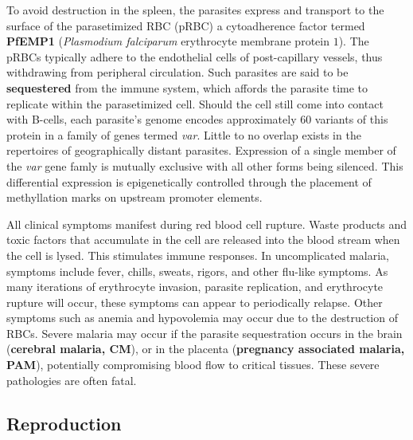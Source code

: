 To avoid destruction in the spleen, the parasites express and transport to the surface of the parasetimized RBC (pRBC) a cytoadherence factor termed \textbf{PfEMP1} (\textit{Plasmodium falciparum} erythrocyte membrane protein $1$)\cite{Flick:2004fn}.  The pRBCs typically adhere to the endothelial cells of post-capillary vessels, thus withdrawing from peripheral circulation\cite{Fernandez:1998hn}.  Such parasites are said to be \textbf{sequestered} from the immune system, which affords the parasite time to replicate within the parasetimized cell.  Should the cell still come into contact with B-cells, each parasite's genome encodes approximately $60$ variants of this protein in a family of genes termed \textit{var}.  Little to no overlap exists in the repertoires of geographically distant parasites\cite{Zilversmit:2013jj}.  Expression of a single member of the \textit{var} gene famly is mutually exclusive with all other forms being silenced.  This differential expression is epigenetically controlled through the placement of methyllation marks on upstream promoter elements\cite{Jiang:2013bk}.

All clinical symptoms manifest during red blood cell rupture.  Waste products and toxic factors that accumulate in the cell are released into the blood stream when the cell is lysed.  This stimulates immune responses.  In uncomplicated malaria, symptoms include fever, chills, sweats, rigors, and other flu-like symptoms.  As many iterations of erythrocyte invasion, parasite replication, and erythrocyte rupture will occur, these symptoms can appear to periodically relapse.  Other symptoms such as anemia and hypovolemia may occur due to the destruction of RBCs.  Severe malaria may occur if the parasite sequestration occurs in the brain (\textbf{cerebral malaria, CM}), or in the placenta (\textbf{pregnancy associated malaria, PAM}), potentially compromising blood flow to critical tissues.  These severe pathologies are often fatal\cite{AlessandroBartoloni:2012gl}.

\subsection{Reproduction}

